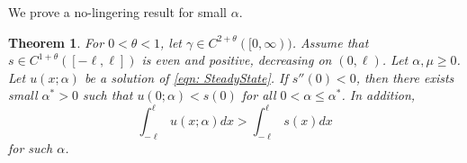 \documentclass{article}
\newtheorem{theorem}{Theorem}[section]
\begin{document}


We prove a no-lingering result for small $\alpha$.

\begin{theorem} \label{thm:small alpha}For $0<\theta<1$, let $\gamma\in C^{2+\theta}([0,\infty))$. Assume that $s\in C^{1+\theta}([-\ell,\ell])$ is even and positive, decreasing on $(0,\ell)$. Let $\alpha,\mu\ge 0$. Let $u(x;\alpha)$ be a solution of \eqref{eqn: SteadyState}. If $s''(0)<0$, then there exists small $\alpha^*>0$ such that $u(0;\alpha)< s(0)$ for all $0<\alpha\le\alpha^*$. In addition, 
\begin{equation*}
    \int_{-\ell}^{\ell}u(x;\alpha)dx > \int_{-\ell}^{\ell}s(x)dx
\end{equation*} for such $\alpha$.
    
\end{theorem}
\end{document}
